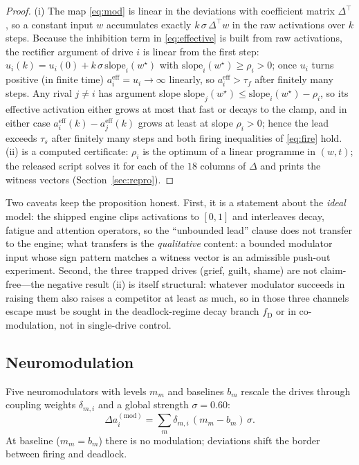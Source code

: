 \documentclass[journal]{IEEEtran}
\newcommand{\bslope}{\mathrm{slope}}
\begin{document}
\begin{proof}
(i) The map \eqref{eq:mod} is linear in the deviations with coefficient
matrix $\Delta^{\top}$, so a constant input $w$ accumulates exactly
$k\,\sigma\,\Delta^{\top}w$ in the raw activations over $k$ steps.
Because the inhibition term in \eqref{eq:effective} is built from raw
activations, the rectifier argument of drive $i$ is linear from the
first step:
$u_i(k)=u_i(0)+k\,\sigma\,\bslope_i(w^{\star})$ with
$\bslope_i(w^{\star})\ge\rho_i>0$; once $u_i$ turns positive (in finite
time) $a_i^{\mathrm{eff}}=u_i\to\infty$ linearly, so
$a_i^{\mathrm{eff}}>\tau_f$ after finitely many steps. Any rival
$j\ne i$ has argument slope
$\bslope_j(w^{\star})\le\bslope_i(w^{\star})-\rho_i$, so its effective
activation either grows at most that fast or decays to the clamp, and
in either case
$a_i^{\mathrm{eff}}(k)-a_j^{\mathrm{eff}}(k)$ grows at least at slope
$\rho_i>0$; hence the lead exceeds $\tau_s$ after finitely many steps
and both firing inequalities of \eqref{eq:fire} hold. (ii) is a
computed certificate: $\rho_i$ is the optimum of a linear programme in
$(w,t)$; the released script solves it for each of the $18$ columns of
$\Delta$ and prints the witness vectors (Section~\ref{sec:repro}).
\end{proof}

Two caveats keep the proposition honest. First, it is a statement about
the \emph{ideal} model: the shipped engine clips activations to
$[0,1]$ and interleaves decay, fatigue and attention operators, so the
``unbounded lead'' clause does not transfer to the engine; what transfers
is the \emph{qualitative} content: a bounded modulator input whose sign
pattern matches a witness vector is an admissible push-out experiment.
Second, the three trapped drives (grief, guilt, shame) are
not claim-free---the negative result (ii) is itself structural:
whatever modulator succeeds in raising them also raises a competitor at
least as much, so in those three channels escape must be sought in the
deadlock-regime decay branch $f_{\mathrm{D}}$ or in co-modulation, not
in single-drive control.

\subsection*{Neuromodulation}
Five neuromodulators with levels $m_m$ and baselines $b_m$ rescale the
drives through coupling weights $\delta_{m,i}$ and a global strength
$\sigma=0.60$:
\begin{equation}
\label{eq:mod}
\Delta a_i^{(\mathrm{mod})} = \sum_{m} \delta_{m,i}\,
(m_m - b_m)\,\sigma .
\end{equation}
At baseline ($m_m=b_m$) there is no modulation; deviations shift the
border between firing and deadlock.
\end{document}
